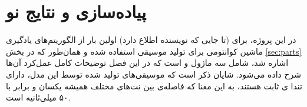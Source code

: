 \chapter{پیاده‌سازی و نتایج نو}

در این پروژه، برای (تا جایی که نویسنده اطلاع دارد) اولین بار از الگوریتم‌های یادگیری ماشین کوانتومی برای تولید موسیقی استفاده شده و همان‌طور که در بخش
\ref{sec:parts}
اشاره شد، شامل سه ماژول 
و
است که در این فصل توضیحات کامل عمل‌کرد آن‌ها شرح داده می‌شود.
شایان ذکر است که موسیقی‌های تولید شده توسط این مدل، دارای تندا
ی ثابت هستند، به این معنا که فاصله‌ی بین نت‌های مختلف همیشه یکسان و برابر با ۵۰ میلی‌ثانیه است.



